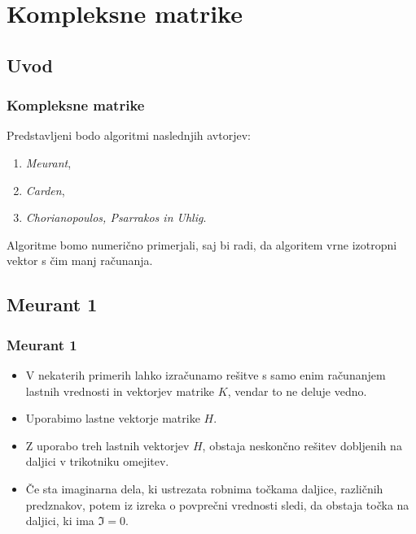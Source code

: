 \documentclass{beamer}
\begin{document}
\section{Kompleksne matrike} %
\subsection{Uvod}
\begin{frame}
\frametitle{Kompleksne matrike}
Predstavljeni bodo algoritmi naslednjih avtorjev:\medskip
\begin{enumerate}[1.]
\item \emph{Meurant},
\item \emph{Carden},
\item \emph{Chorianopoulos, Psarrakos in Uhlig}.
\end{enumerate}\medskip
Algoritme bomo numerično primerjali, saj bi radi, da algoritem vrne izotropni vektor s čim manj računanja.
\end{frame}
\subsection{Meurant 1}
\begin{frame}
\frametitle{Meurant 1}
\begin{itemize}
\item V nekaterih primerih lahko izračunamo rešitve s samo enim ra\-ču\-na\-njem lastnih vrednosti in vektorjev matrike $K$, vendar to ne deluje vedno.
\item Uporabimo lastne vektorje matrike $H$.
\item Z uporabo treh lastnih vektorjev $H$, obstaja neskončno rešitev dobljenih na daljici v trikotniku omejitev.
\item  Če sta imaginarna dela, ki ustrezata robnima točkama daljice, različnih predznakov, potem iz izreka o povprečni vrednosti sledi, da obstaja točka na daljici, ki ima $\Im =0$.%
\end{itemize}
\end{frame}
\end{document}
